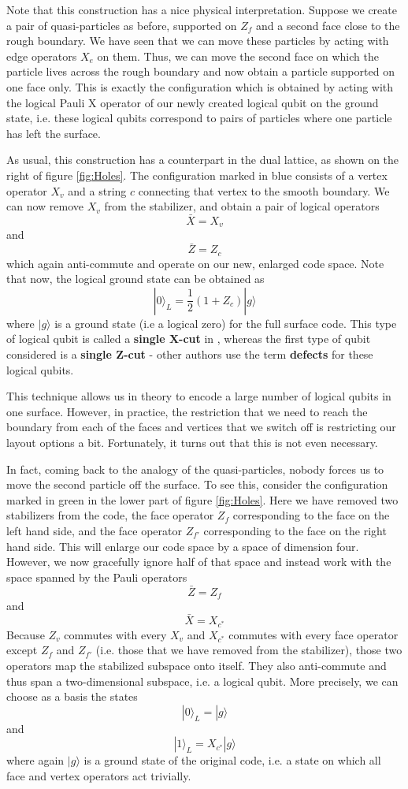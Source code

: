 \documentclass[a4paper, draft]{article}
\theoremstyle{own}
\theoremstyle{remark}
\begin{document}
Note that this construction has a nice physical interpretation. Suppose we create a pair of quasi-particles as before, supported on $Z_f$ and a second face close to the rough boundary. We have seen that we can move these particles by acting with edge operators $X_e$ on them. Thus, we can move the second face on which the particle lives across the rough boundary and now obtain a particle supported on one face only. This is exactly the configuration which is obtained by acting with the logical Pauli X operator of our newly created logical qubit on the ground state, i.e. these logical qubits correspond to pairs of particles where one particle has left the surface.

As usual, this construction has a counterpart in the dual lattice, as shown on the right of figure \ref{fig:Holes}. The configuration marked in blue consists of a vertex operator $X_v$ and a string $c$ connecting that vertex to the smooth boundary. We can now remove $X_v$ from the stabilizer, and obtain a pair of logical operators 
$$
\bar{X} = X_{v} 
$$
and
$$
\bar{Z} = Z_c
$$
which again anti-commute and operate on our new, enlarged code space. Note that now, the logical ground state can be obtained as
$$
|0 \rangle_L = \frac{1}{2}(1 + Z_c) |g \rangle
$$
where $|g\rangle$ is a ground state (i.e a logical zero) for the full surface code. This type of logical qubit is called a {\bf single X-cut} in \cite{SurfaceCodes}, whereas the first type of qubit considered is a {\bf single Z-cut} - other authors use the term {\bf defects} for these logical qubits. 

This technique allows us in theory to encode a large number of logical qubits in one surface. However, in practice, the restriction that we need to reach the boundary from each of the faces and vertices that we switch off is restricting our layout options a bit. Fortunately, it turns out that this is not even necessary.

In fact, coming back to the analogy of the quasi-particles, nobody forces us to move the second particle off the surface. To see this, consider the configuration marked in green in the lower part of figure \ref{fig:Holes}. Here we have removed two stabilizers from the code, the face operator $Z_f$ corresponding to the face on the left hand side, and the face operator $Z_{f'}$ corresponding to the face on the right hand side. This will enlarge our code space by a space of dimension four. However, we now gracefully ignore half of that space and instead work with the space spanned by the Pauli operators
$$
\bar{Z} = Z_f 
$$
and
$$
\bar{X} = X_{c^*} 
$$
Because $Z_v$ commutes with every $X_v$ and $X_{c^*}$ commutes with every face operator except $Z_f$ and $Z_{f'}$ (i.e. those that we have removed from the stabilizer), those two operators map the stabilized subspace onto itself. They also anti-commute and thus span a two-dimensional subspace, i.e. a logical qubit. More precisely, we can choose as a basis the states
$$
|0 \rangle_L = |g \rangle
$$
and
$$
|1 \rangle_L = X_{c^*} |g \rangle
$$
where again $|g \rangle$ is a ground state of the original code, i.e. a state on which all face and vertex operators act trivially. 
\end{document}
